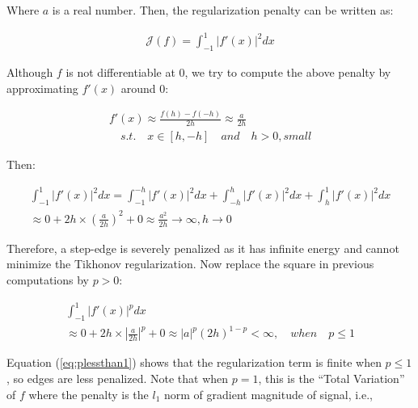 Where $a$ is a real number. Then, the regularization penalty can be written as:

\begin{equation}
\begin{gathered}
\mathcal{J}(f) = \int_{-1}^{1} \left | {f}'(x) \right |^{2}dx
\end{gathered}
\end{equation}

Although $f$ is not differentiable at $0$, we try to compute the above penalty by approximating ${f}'(x)$ around $0$:

\begin{equation}
\begin{gathered}
{f}'(x) \approx \frac{f(h)-f(-h)}{2h} \approx \frac{a}{2h} \\
\quad s.t. \quad x\in [h,-h] \quad and \quad h>0, small
\end{gathered}
\end{equation}

Then:

\begin{equation}
\begin{gathered}
\int_{-1}^{1} \left | {f}'(x) \right |^{2}dx = \int_{-1}^{-h} \left | {f}'(x) \right |^{2}dx + \int_{-h}^{h} \left | {f}'(x) \right |^{2}dx + \int_{h}^{1} \left | {f}'(x) \right |^{2}dx \\
\approx 0 + 2h \times (\frac{a}{2h})^{2} + 0 \approx \frac{a^2}{2h} \rightarrow \infty, h \rightarrow 0
\end{gathered}
\end{equation}

Therefore, a step-edge is severely penalized as it has infinite energy and cannot minimize the Tikhonov regularization. Now replace the square in previous computations by $p>0$:

\begin{equation}
\label{eq:plessthan1}
\begin{gathered}
\int_{-1}^{1} \left | {f}'(x) \right |^{p}dx \\
\approx 0 + 2h \times |\frac{a}{2h}|^{p} + 0 \approx |a|^{p}(2h)^{1-p} < \infty, \quad when \quad p \leq 1
\end{gathered}
\end{equation}

Equation (\ref{eq:plessthan1}) shows that the regularization term is finite when $p \leq 1$, so edges are less penalized. Note that when $p=1$, this is the ``Total Variation'' of $f$ \cite{rudin1992nonlinear} where the penalty is the $l_{1}$ norm of gradient magnitude of signal, i.e.,

